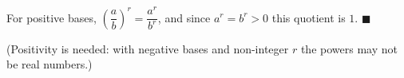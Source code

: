 For positive bases, $\left(\dfrac ab\right)^r=\dfrac{a^r}{b^r}$, and since $a^r=b^r>0$ this quotient is $1$. $\blacksquare$

(Positivity is needed: with negative bases and non-integer $r$ the powers may not be real numbers.)
